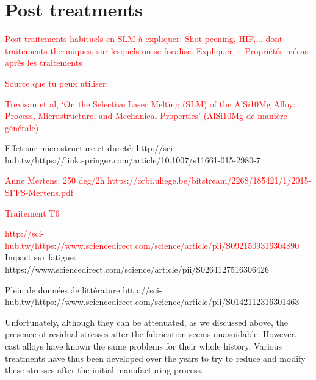 \section{Post treatments}
\textcolor{red}{Post-traitements habituels en SLM à expliquer: Shot peening, HIP,... dont traitements thermiques, sur lesquels on se focalise. Expliquer + Propriétés mécas après les traitements}

\textcolor{red}{Source que tu peux utiliser:}

\textcolor{red}{Trevisan et al, ‘On the Selective Laser Melting (SLM) of the AlSi10Mg Alloy: Process, Microstructure, and Mechanical Properties’ (AlSi10Mg de manière générale)}

Effet sur microstructure et dureté:
http://sci-hub.tw/https://link.springer.com/article/10.1007/s11661-015-2980-7

\textcolor{red}{Anne Mertens: 250 deg/2h
https://orbi.uliege.be/bitstream/2268/185421/1/2015-SFFS-Mertens.pdf}

\textcolor{red}{Traitement T6 \parencite{ABOULKHAIR2016139}}

\textcolor{red}{http://sci-hub.tw/https://www.sciencedirect.com/science/article/pii/S0921509316304890}\\

Impact sur fatigue:
https://www.sciencedirect.com/science/article/pii/S0264127516306426

Plein de données de littérature
http://sci-hub.tw/https://www.sciencedirect.com/science/article/pii/S0142112316301463

Unfortunately, although they can be attenuated, as we discussed above, the presence of residual stresses after the fabrication seems unavoidable. However, cast alloys have known the same problems for their whole history. Various treatments have thus been developed over the years to try to reduce and modify these stresses after the initial manufacturing process.

